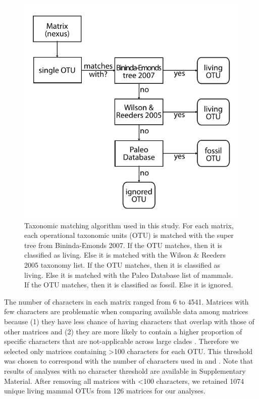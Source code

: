 \begin{figure}[!h]
\centering
    \includegraphics[width=1\textwidth]{Missing_mammals/Figures/Supp_figure_Taxonomic_algorithm.pdf}
\caption[Taxonomic matching algorithm used in this study.]{Taxonomic matching algorithm used in this study. For each matrix, each operational taxonomic units (OTU) is matched with the super tree from Bininda-Emonds 2007. If the OTU matches, then it is classified as living. Else it is matched with the Wilson \& Reeders 2005 taxonomy list. If the OTU matches, then it is classified as living. Else it is matched with the Paleo Database list of mammals. If the OTU matches, then it is classified as fossil. Else it is ignored.}
\label{Supp_figure_Taxonomic_algorithm}
\end{figure}

The number of characters in each matrix ranged from 6 to 4541.
Matrices with few characters are problematic when comparing available data among matrices because (1) they have less chance of having characters that overlap with those of other matrices \citep{wagner2000} and (2) they are more likely to contain a higher proportion of specific characters that are not-applicable across large clades \citep[e.g. ``antler ramifications'' is a character that is only applicable to Cervidae not all mammals][]{Brazeau2011}.
Therefore we selected only matrices containing \textgreater 100 characters for each OTU.
This threshold was chosen to correspond with the number of characters used in \citep{GuillermeCooper} and \citep{harrisonamong-character2014}.
Note that results of analyses with no character threshold are available in Supplementary Material. 
After removing all matrices with \textless 100 characters, we retained 1074 unique living mammal OTUs from 126 matrices for our analyses. %

